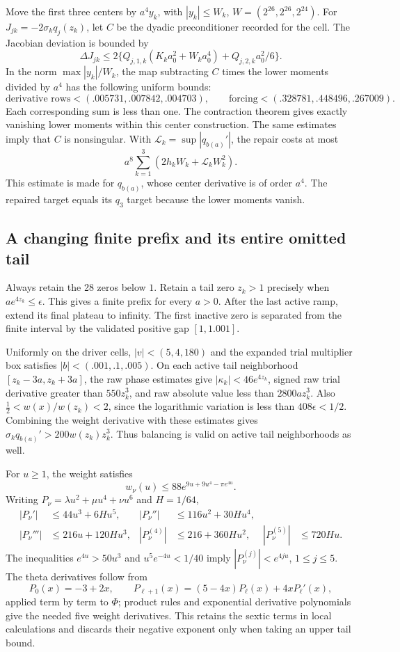Move the first three centers by \(a^4y_k\), with
\(|y_k|\leq W_k\), \(W=(2^{26},2^{26},2^{24})\).
For \(J_{jk}=-2\sigma_kq_j(z_k)\), let \(C\) be the dyadic
preconditioner recorded for the cell. The Jacobian deviation is bounded by
\[
 \Delta J_{jk}\leq
 2\{Q_{j,1,k}(K_ka_0^2+W_ka_0^4)+Q_{j,2,k}a_0^2/6\}.
\]
In the norm \(\max|y_k|/W_k\), the map subtracting \(C\) times the
lower moments divided by \(a^4\) has the following uniform bounds:
\[
 \text{derivative rows}<(.005731,.007842,.004703),\qquad
 \text{forcing}<(.328781,.448496,.267009).
\]
Each corresponding sum is less than one. The contraction theorem gives
exactly vanishing lower moments within this center construction.
The same estimates imply that \(C\) is nonsingular.
With \(\mathcal L_k=\sup|q_{b(a)}'|\), the repair costs at most
\[
 a^8\sum_{k=1}^3(2h_kW_k+\mathcal L_kW_k^2).
\]
This estimate is made for \(q_{b(a)}\), whose center derivative is of
order \(a^4\). The repaired target equals its \(q_3\) target because
the lower moments vanish.

\subsection{A changing finite prefix and its entire omitted tail}
Always retain the 28 zeros below \(1\). Retain a tail zero \(z_k>1\)
precisely when \(ae^{4z_k}\leq\epsilon\).
This gives a finite prefix for every \(a>0\).
After the last active ramp, extend its final plateau to infinity.
The first inactive zero is separated from the finite interval by the
validated positive gap \([1,1.001]\).

Uniformly on the driver cells, \(|v|<(5,4,180)\) and the expanded
trial multiplier box satisfies
\(|b|<(.001,.1,.005)\).
On each active tail neighborhood \([z_k-3a,z_k+3a]\), the raw phase
estimates give \(|\kappa_k|<46e^{4z_k}\), signed raw trial derivative
greater than \(550z_k^3\), and raw absolute value less than \(2800az_k^3\).
Also \(\tfrac12<w(x)/w(z_k)<2\), since the logarithmic variation
is less than \(408\epsilon<1/2\).
Combining the weight derivative with these estimates gives
\(\sigma_k q_{b(a)}'>200w(z_k)z_k^3\).
Thus balancing is valid on active tail neighborhoods as well.

For \(u\geq1\), the weight satisfies
\[
 w_\nu(u)\leq88e^{9u+9u^4-\pi e^{4u}} .
\]
Writing \(P_\nu=\lambda u^2+\mu u^4+\nu u^6\) and \(H=1/64\),
\begin{align*}
 |P_\nu'|&\leq44u^3+6Hu^5,&
 |P_\nu''|&\leq116u^2+30Hu^4,\\
 |P_\nu'''|&\leq216u+120Hu^3,&
 |P_\nu^{(4)}|&\leq216+360Hu^2,&
 |P_\nu^{(5)}|&\leq720Hu .
\end{align*}
The inequalities \(e^{4u}>50u^3\) and \(u^5e^{-4u}<1/40\) imply
\(|P_\nu^{(j)}|<e^{4ju}\), \(1\leq j\leq5\).
The theta derivatives follow from
\[
 P_0(x)=-3+2x,\qquad
 P_{\ell+1}(x)=(5-4x)P_\ell(x)+4xP_\ell'(x),
\]
applied term by term to \(\Phi\); product rules and exponential
derivative polynomials give the needed five weight derivatives.
This retains the sextic terms in local calculations and discards
their negative exponent only when taking an upper tail bound.

